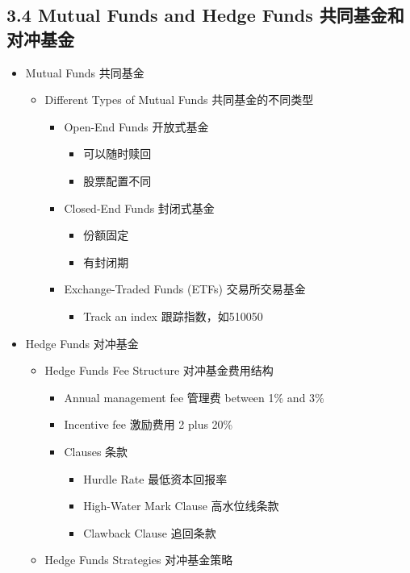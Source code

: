 \documentclass[a4paper,6pt,twoside,openany]{article}
\begin{document}
\subsection*{3.4 Mutual Funds and Hedge Funds 共同基金和对冲基金}
\begin{itemize}
\item Mutual Funds 共同基金
  \begin{itemize}
  \item Different Types of Mutual Funds 共同基金的不同类型
    \begin{itemize}
    \item Open-End Funds 开放式基金
      \begin{itemize}
      \item 可以随时赎回
      \item 股票配置不同
      \end{itemize}
    \item Closed-End Funds 封闭式基金
      \begin{itemize}
      \item 份额固定
      \item 有封闭期
      \end{itemize}
    \item Exchange-Traded Funds (ETFs) 交易所交易基金
      \begin{itemize}
      \item Track an index 跟踪指数，如510050
      \end{itemize}
    \end{itemize}
  \end{itemize}
\item Hedge Funds 对冲基金
  \begin{itemize}
  \item Hedge Funds Fee Structure 对冲基金费用结构
    \begin{itemize}
    \item Annual management fee 管理费 between 1\% and 3\%
    \item Incentive fee 激励费用 2 plus 20\%
    \item Clauses 条款
      \begin{itemize}
      \item Hurdle Rate 最低资本回报率
      \item High-Water Mark Clause 高水位线条款
      \item Clawback Clause 追回条款
      \end{itemize}
    \end{itemize}
  \item Hedge Funds Strategies 对冲基金策略

\end{itemize}
\end{itemize}
\end{document}
